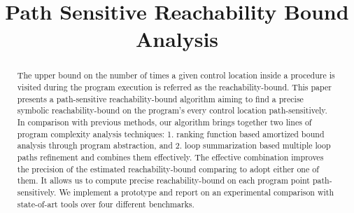 \documentclass[runningheads]{llncs}
\begin{document}
%
\title{Path Sensitive Reachability Bound Analysis}
%
%
%

\maketitle              

%
\begin{abstract}
    The upper bound on the number of times a given control location 
    inside a procedure is visited during the program execution is referred as the reachability-bound.
    This paper presents a path-sensitive reachability-bound algorithm
    aiming to find a precise symbolic reachability-bound on the program's every control location path-sensitively.
    In comparison with previous methods, our algorithm brings together two lines of program complexity analysis techniques:
    1. ranking function based amortized bound analysis through program abstraction, and
    2. loop summarization based multiple loop paths refinement
    and combines them effectively. 
    The effective combination improves the precision of the estimated reachability-bound comparing to adopt either one of them.
    It allows us to compute precise reachability-bound on each program point path-sensitively.
    We implement a prototype and report on an experimental comparison with state-of-art tools over four different benchmarks.
\end{abstract}
%
%
%
\end{document}
